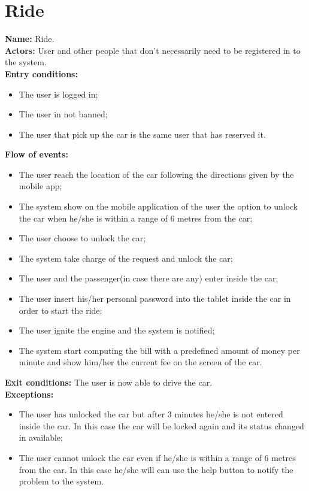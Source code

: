 \section*{Ride}
\textbf{Name:} Ride.\\
\textbf{Actors:} User and other people that don't necessarily need to be registered in to the system.\\
\textbf{Entry conditions:}
\begin{itemize}
\item The user is logged in;
\item The user in not banned;
\item The user that pick up the car is the same user that has reserved it.
\end{itemize}
\textbf{Flow of events:}
\begin{itemize}
\item The user reach the location of the car following the directions given by the mobile app;
\item The system show on the mobile application of the user the option to unlock the car when he/she is within a range of 6 metres from the car;
\item The user choose to unlock the car;
\item The system take charge of the request and unlock the car;
\item The user and the passenger(in case there are any) enter inside the car;
\item The user insert his/her personal password into the tablet inside the car in order to start the ride;
\item The user ignite the engine and the system is notified;
\item The system start computing the bill with a predefined amount of money per minute and show him/her the current fee on the screen of the car.
\end{itemize}
\textbf{Exit conditions:} The user is now able to drive the car.\\
\textbf{Exceptions:}
\begin{itemize}
\item The user has unlocked the car but after 3 minutes he/she is not entered inside the car. In this case  the car will be locked again and its status changed in available;
\item The user cannot unlock the car even if he/she is within a range of 6 metres from the car. In this case he/she will can use the help button  to notify the problem to the system.
\end{itemize}



